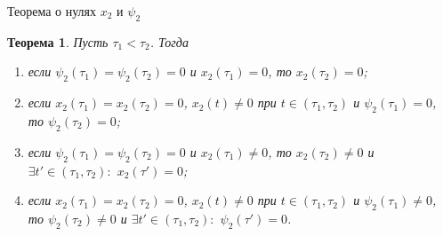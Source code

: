 \documentclass[12pt, a4paper]{article}
\theoremstyle{rusdef}
\newtheorem{theorem}{Теорема}
\begin{document}
\parbox{11.8cm}{
  \begin{center}
    {\Huge Теорема о нулях $x_2$ и $\psi_2$}
  \end{center}
}

\begin{theorem}
  Пусть $\tau_1 < \tau_2$. Тогда
  \begin{enumerate}
    \item если $\psi_2(\tau_1) = \psi_2(\tau_2) = 0$ и $x_2(\tau_1) = 0$, то $x_2(\tau_2) = 0$;
    \item если $x_2(\tau_1) = x_2(\tau_2) = 0$, ${x_2(t) \neq 0}$ при ${t \in (\tau_1, \tau_2)}$ и ${\psi_2(\tau_1) = 0}$, то $\psi_2(\tau_2) = 0$;
    \item если $\psi_2(\tau_1) = \psi_2(\tau_2) = 0$ и $x_2(\tau_1) \neq 0$, то $x_2(\tau_2) \neq 0$ и $\exists t' \in (\tau_1, \tau_2)\colon$ $x_2(\tau') = 0$;
    \item если $x_2(\tau_1) = x_2(\tau_2) = 0$, ${x_2(t) \neq 0}$ при ${t \in (\tau_1, \tau_2)}$ и ${\psi_2(\tau_1) \neq 0}$, то $\psi_2(\tau_2) \neq 0$ и $\exists t' \in (\tau_1, \tau_2)\colon$ $\psi_2(\tau') = 0$.
  \end{enumerate}
\end{theorem}
\end{document}
